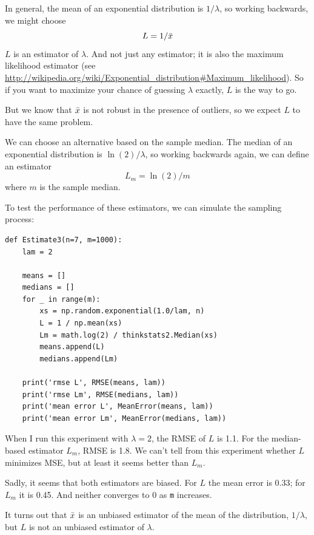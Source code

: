 \documentclass[12pt]{book}
\begin{document}
\newcommand{\lamhat}{L}
\newcommand{\lamhatmed}{L_m}

In general, the mean of an exponential distribution is $1/\lambda$,
so working backwards, we might choose
%
\[ \lamhat = 1 / \xbar\]
%
$\lamhat$ is an
estimator of $\lambda$.  And not just any estimator; it is also the
maximum likelihood estimator (see
\url{http://wikipedia.org/wiki/Exponential_distribution#Maximum_likelihood}).
So if you want to maximize your chance of guessing $\lambda$ exactly,
$\lamhat$ is the way to go.

But we know that $\bar{x}$ is not robust in the presence of outliers, so
we expect $\lamhat$ to have the same problem.

We can choose an alternative based on the sample median.
The median of an exponential distribution is $\ln(2) / \lambda$,
so working backwards again, we can define an estimator
%
\[ \lamhatmed = \ln(2) / m \]
%
where $m$ is the sample median.

To test the performance of these estimators, we can simulate the
sampling process:

\begin{verbatim}
def Estimate3(n=7, m=1000):
    lam = 2

    means = []
    medians = []
    for _ in range(m):
        xs = np.random.exponential(1.0/lam, n)
        L = 1 / np.mean(xs)
        Lm = math.log(2) / thinkstats2.Median(xs)
        means.append(L)
        medians.append(Lm)

    print('rmse L', RMSE(means, lam))
    print('rmse Lm', RMSE(medians, lam))
    print('mean error L', MeanError(means, lam))
    print('mean error Lm', MeanError(medians, lam))
\end{verbatim}

When I run this experiment with $\lambda=2$, the RMSE of $L$ is
1.1.  For the median-based estimator $L_m$, RMSE is 1.8.  We can't
tell from this experiment whether $L$ minimizes MSE, but at least
it seems better than $L_m$.

Sadly, it seems that both estimators are biased.  For $L$ the mean
error is 0.33; for $L_m$ it is 0.45.  And neither converges to 0
as \verb"m" increases.

It turns out that $\bar{x}$ is an unbiased estimator of the mean
of the distribution, $1 / \lambda$, but $L$ is not an unbiased
estimator of $\lambda$.
\end{document}
